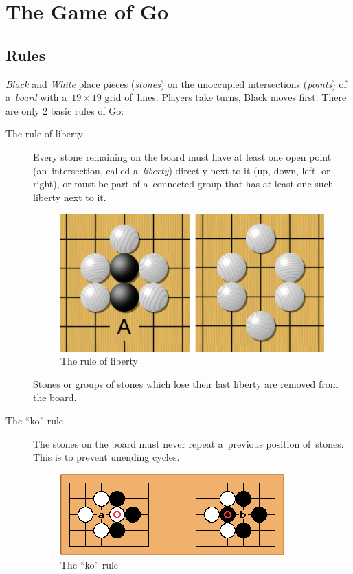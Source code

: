 \section{The Game of Go}
\label{sec:Go}

\subsection{Rules}

\emph{Black} and \emph{White} place pieces (\emph{stones}) on the unoccupied intersections (\emph{points}) of a~\emph{board} with a~$19\times19$ grid of~lines.
Players take turns, Black moves first.
There are only 2 basic rules of Go:
\begin{description}
  \item [The rule of liberty]
    Every stone remaining on the board must have at least one open point (an~intersection, called a~\emph{liberty}) directly next to it (up, down, left, or right), or must be part of a~connected group that has at least one such liberty next to it.
    \begin{figure}[H]
      \centering
      \includegraphics[width=.5\textwidth]{../img/Go_rule_of_liberty.png}
      \caption{The rule of liberty}
      \label{fig:Go-rule-liberty}
    \end{figure}

    Stones or groups of stones which lose their last liberty are removed from the board.

  \item [The ``ko'' rule]
    The stones on the board must never repeat a~previous position of~stones.
    This is to prevent unending cycles.
    \begin{figure}[H]
      \centering
      \includegraphics[width=.5\textwidth]{../img/Go_ko_rule.png}
      \caption{The ``ko'' rule}
      \label{fig:Go-Ko-rule}
    \end{figure}

\end{description}

